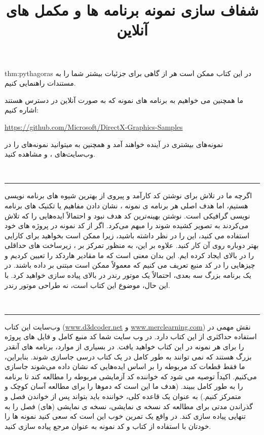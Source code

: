 {        \begin{theo}{thm:pythagoras}
            در این کتاب ممکن است هر از گاهی برای جزئیات بیشتر شما را به مستندات راهنمایی کنیم.
        \end{theo}
        ما همچنین می خواهیم به برنامه های نمونه  که به صورت آنلاین در دسترس هستند اشاره کنیم:

        \begin{flushleft}
            \href{https://github.com/Microsoft/DirectX-Graphics-Samples}{https://github.com/Microsoft/DirectX-Graphics-Samples}
        \end{flushleft}

        نمونه‌های بیشتری در آینده خواهند آمد و همچنین به میتوانید نمونه‌های  را در وب‌سایت‌های ،  و  مشاهده کنید.
    } %

    \title{
        \LARGE
        \textbf{شفاف سازی}
    }
    \\ \rule{\textwidth}{0.5pt}
    {\large
    اگرچه ما در تلاش برای نوشتن کد کارآمد و پیروی از بهترین شیوه های برنامه نویسی  هستیم، اما هدف اصلی هر برنامه ی نمونه ، نشان دادن مفاهیم  یا تکنیک های برنامه نویسی گرافیکی است.
    نوشتن بهینه‌ترین کد هدف نبود و احتمالاً ایده‌هایی را که تلاش می‌کردند به تصویر کشیده شوند را مبهم می‌کرد.
    اگر از کد نمونه در پروژه های خود استفاده می کنید، این را در نظر داشته باشید، زیرا ممکن است بخواهید برای کارایی بهتر دوباره روی آن کار کنید.
    علاوه بر این، به منظور تمرکز بر ، زیرساخت های حداقلی را در بالای  ایجاد کرده ایم. این بدان معنی است که ما مقادیر هاردکد را تعیین کردیم و چیزهایی را در کد منبع تعریف می کنیم که معمولاً ممکن است مبتنی بر داده باشند.
    در یک برنامه بزرگ سه بعدی، احتمالاً یک موتور رندر در بالای  پیاده سازی خواهید کرد. با این حال، موضوع این کتاب  است، نه طراحی موتور رندر.
    } %

    \title{
        \LARGE
        \textbf{نمونه برنامه ها و مکمل های آنلاین}
    }
    \\ \rule{\textwidth}{0.5pt}
    {\large
    وب‌سایت این کتاب (\href{www.d3dcoder.net}{www.d3dcoder.net} و \href{www.merclearning.com}{www.merclearning.com}) نقش مهمی در استفاده حداکثری از این کتاب دارد.
    در وب سایت شما کد منبع کامل و فایل های پروژه را برای هر نمونه در این کتاب خواهید یافت.
    در بسیاری از موارد، برنامه های  آنقدر بزرگ هستند که نمی توانند به طور کامل در یک کتاب درسی جاسازی شوند. بنابراین، ما فقط قطعات کد مربوطه را بر اساس ایده‌هایی که نشان داده می‌شوند جاسازی می‌کنیم.
    اکیداً توصیه می شود که خواننده کد آزمایشی مربوطه را مطالعه کند تا برنامه را به طور کامل ببیند. (هدف ما این است که دموها را برای مطالعه آسان کوچک و متمرکز کنیم.) به عنوان یک قاعده کلی، خواننده باید بتواند پس از خواندن فصل و گذراندن مدتی برای مطالعه کد نسخه ی نمایشی، نسخه ی نمایشی (های) فصل را به تنهایی پیاده سازی کند.
    در واقع یک تمرین خوب این است که سعی کنید نمونه ها را خودتان با استفاده از کتاب و کد نمونه به عنوان مرجع پیاده سازی کنید.
    } %

